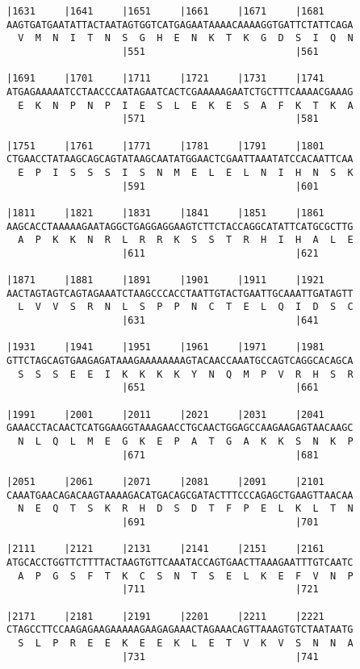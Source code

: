 \documentclass{article}
\begin{document}
\begin{Verbatim}
|1631     |1641     |1651     |1661     |1671     |1681     
AAGTGATGAATATTACTAATAGTGGTCATGAGAATAAAACAAAAGGTGATTCTATTCAGA
  V  M  N  I  T  N  S  G  H  E  N  K  T  K  G  D  S  I  Q  N
                    |551                          |561      
  
|1691     |1701     |1711     |1721     |1731     |1741     
ATGAGAAAAATCCTAACCCAATAGAATCACTCGAAAAAGAATCTGCTTTCAAAACGAAAG
  E  K  N  P  N  P  I  E  S  L  E  K  E  S  A  F  K  T  K  A
                    |571                          |581      
  
|1751     |1761     |1771     |1781     |1791     |1801     
CTGAACCTATAAGCAGCAGTATAAGCAATATGGAACTCGAATTAAATATCCACAATTCAA
  E  P  I  S  S  S  I  S  N  M  E  L  E  L  N  I  H  N  S  K
                    |591                          |601      
  
|1811     |1821     |1831     |1841     |1851     |1861     
AAGCACCTAAAAAGAATAGGCTGAGGAGGAAGTCTTCTACCAGGCATATTCATGCGCTTG
  A  P  K  K  N  R  L  R  R  K  S  S  T  R  H  I  H  A  L  E
                    |611                          |621      
  
|1871     |1881     |1891     |1901     |1911     |1921     
AACTAGTAGTCAGTAGAAATCTAAGCCCACCTAATTGTACTGAATTGCAAATTGATAGTT
  L  V  V  S  R  N  L  S  P  P  N  C  T  E  L  Q  I  D  S  C
                    |631                          |641      
  
|1931     |1941     |1951     |1961     |1971     |1981     
GTTCTAGCAGTGAAGAGATAAAGAAAAAAAAGTACAACCAAATGCCAGTCAGGCACAGCA
  S  S  S  E  E  I  K  K  K  K  Y  N  Q  M  P  V  R  H  S  R
                    |651                          |661      
  
|1991     |2001     |2011     |2021     |2031     |2041     
GAAACCTACAACTCATGGAAGGTAAAGAACCTGCAACTGGAGCCAAGAAGAGTAACAAGC
  N  L  Q  L  M  E  G  K  E  P  A  T  G  A  K  K  S  N  K  P
                    |671                          |681      
  
|2051     |2061     |2071     |2081     |2091     |2101     
CAAATGAACAGACAAGTAAAAGACATGACAGCGATACTTTCCCAGAGCTGAAGTTAACAA
  N  E  Q  T  S  K  R  H  D  S  D  T  F  P  E  L  K  L  T  N
                    |691                          |701      
  
|2111     |2121     |2131     |2141     |2151     |2161     
ATGCACCTGGTTCTTTTACTAAGTGTTCAAATACCAGTGAACTTAAAGAATTTGTCAATC
  A  P  G  S  F  T  K  C  S  N  T  S  E  L  K  E  F  V  N  P
                    |711                          |721      
  
|2171     |2181     |2191     |2201     |2211     |2221     
CTAGCCTTCCAAGAGAAGAAAAAGAAGAGAAACTAGAAACAGTTAAAGTGTCTAATAATG
  S  L  P  R  E  E  K  E  E  K  L  E  T  V  K  V  S  N  N  A
                    |731                          |741      
  

\end{Verbatim}
\end{document}
